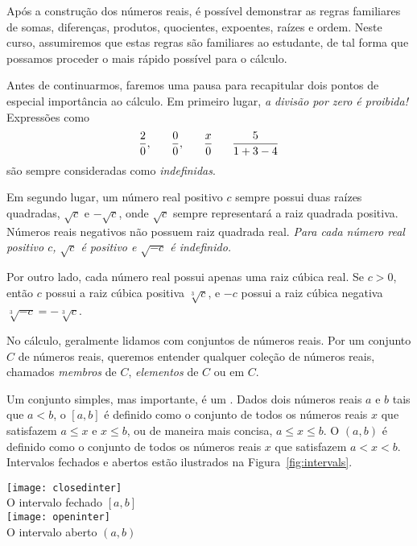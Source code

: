 \documentclass{svmono}
\begin{document}
Após a construção dos números reais, é possível demonstrar as
regras familiares de somas, diferenças, produtos, quocientes,
expoentes, raízes e ordem. Neste curso, assumiremos que estas
regras são familiares ao estudante, de tal forma que possamos
proceder o mais rápido possível para o cálculo.

Antes de continuarmos, faremos uma pausa para recapitular dois
pontos de especial importância ao cálculo. Em primeiro lugar,
\emph{a divisão por zero é proibida!} Expressões como
\[
\frac{2}{0}, \hspace{4ex} \frac{0}{0}, \hspace{4ex} 
\frac{x}{0} \hspace{4ex} \frac{5}{1+3-4}
\]
são sempre consideradas como \emph{indefinidas}.

Em segundo lugar, um número real positivo $c$ sempre possui duas
raízes quadradas, $\sqrt{c}$ e $-\sqrt{c}$, onde $\sqrt{c}$ sempre
representará a raiz quadrada positiva. Números reais negativos não
possuem raiz quadrada real. \emph{Para cada número real positivo
$c$, $\sqrt{c}$ é positivo e $\sqrt{-c}$ é indefinido.}

Por outro lado, cada número real possui apenas uma raiz cúbica real.
Se $c > 0$, então $c$ possui a raiz cúbica positiva $\sqrt[3]{c}$, e $-c$
possui a raiz cúbica negativa $\sqrt[3]{-c} = -\sqrt[3]{c}$.

No cálculo, geralmente lidamos com conjuntos de números reais. Por um
conjunto $C$ de números reais, queremos entender qualquer coleção de
números reais, chamados \emph{membros} de $C$, \emph{elementos} de $C$
ou  em $C$.

Um conjunto simples, mas importante, é um . Dados dois
números reais $a$ e $b$ tais que $a < b$, o
$[a,b]$ é definido como o conjunto de todos os números reais $x$
que satisfazem $a \le x$ e $x \le b$, ou de maneira mais concisa,
$a \le x \le b$.
O  $(a,b)$ é definido como o conjunto de todos
os números reais $x$ que satisfazem $a < x < b$. Intervalos fechados e
abertos estão ilustrados na Figura~\ref{fig:intervals}. 

{
	\texttt{[image: closedinter]}\\
	O intervalo fechado $[a,b]$\\[\baselineskip]
	\texttt{[image: openinter]}\\
	O intervalo aberto $(a,b)$
}
\end{document}
